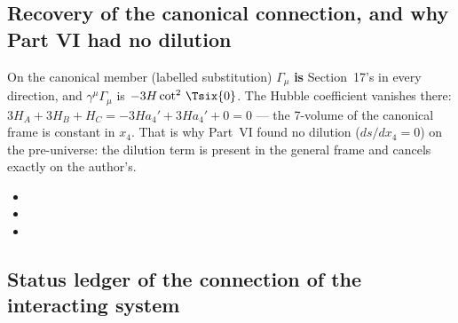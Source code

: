 \subsection{Recovery of the canonical connection, and why Part VI had no dilution}
\label{sec:6.21}

On the canonical member (labelled substitution) $\Gamma_\mu$ \textbf{is} Section~17's
 in every direction, and $\gamma^\mu\Gamma_\mu$ is $-3H\cot^2\,\Tsix{0}$. The
Hubble coefficient vanishes there: $3H_A+3H_B+H_C=-3Ha_4'+3Ha_4'+0=0$ --- the 7-volume of the canonical
frame is constant in $x_4$. That is why Part~VI found no dilution ($ds/dx_4=0$) on the pre-universe: the
dilution term is present in the general frame and cancels exactly on the author's. 
\begin{itemize}
  \item {}
  \item {}
  \item {}
\end{itemize}

\subsection{Status ledger of the connection of the interacting system}
\label{sec:6.22}

